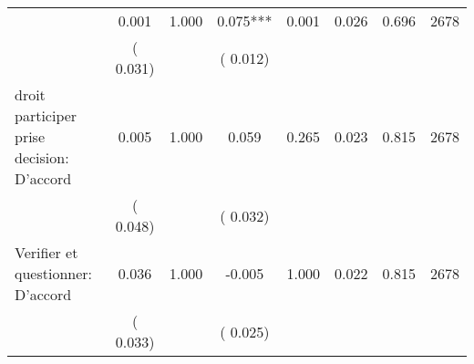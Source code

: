 \begin{tabular}{l*{7}{c}}
        &              0.001       &        1.000  &              0.075***       &        0.001  &              0.026       &              0.696 &  2678 \\ 
                       &       (       0.031)             &                               &       (       0.012)                     &                               &                                               &                                &                      \\ 

 droit participer prise decision: D'accord       &              0.005       &        1.000  &              0.059       &        0.265  &              0.023       &              0.815 &  2678 \\ 
                       &       (       0.048)             &                               &       (       0.032)                     &                               &                                               &                                &                      \\ 

 Verifier et questionner: D'accord       &              0.036       &        1.000  &             -0.005       &        1.000  &              0.022       &              0.815 &  2678 \\ 
                       &       (       0.033)             &                               &       (       0.025)                     &                               &                                               &                                &                      \\ 

\hline \end{tabular}